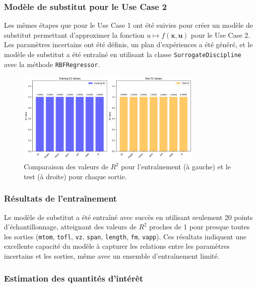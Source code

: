\documentclass[a4paper, 11pt]{article}
\begin{document}
\subsubsection{Modèle de substitut pour le Use Case 2}

Les mêmes étapes que pour le Use Case 1 ont été suivies pour créer un modèle de substitut permettant d’approximer la fonction \( u \mapsto f(\mathbf{x}, \mathbf{u}) \) pour le Use Case 2. Les paramètres incertains ont été définis, un plan d’expériences a été généré, et le modèle de substitut a été entraîné en utilisant la classe \texttt{SurrogateDiscipline} avec la méthode \texttt{RBFRegressor}.






\begin{figure}[H]
    \centering
    \includegraphics[width=0.8\textwidth]{Images_Ayoub/Problem2/UseCase2/Surrogate/R2/R2.png}
    \caption{Comparaison des valeurs de \( R^2 \) pour l’entraînement (à gauche) et le test (à droite) pour chaque sortie.}
    \label{fig:r2_plot_usecase2}
\end{figure}



\subsubsection{Résultats de l’entraînement}
Le modèle de substitut a été entraîné avec succès en utilisant seulement 20 points d’échantillonnage, atteignant des valeurs de \( R^2 \) proches de 1 pour presque toutes les sorties (\texttt{mtom}, \texttt{tofl}, \texttt{vz}, \texttt{span}, \texttt{length}, \texttt{fm}, \texttt{vapp}). Ces résultats indiquent une excellente capacité du modèle à capturer les relations entre les paramètres incertains et les sorties, même avec un ensemble d’entraînement limité.


\subsubsection{Estimation des quantités d’intérêt}
\end{document}
